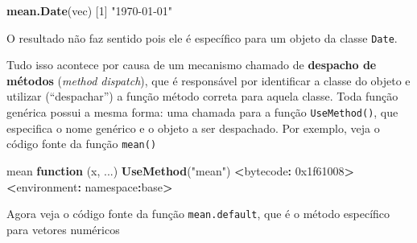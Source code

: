 \documentclass[10pt,a4paper]{book}
\newenvironment{Shaded}{\begin{snugshade}}{\end{snugshade}}
\newcommand{\KeywordTok}[1]{\textcolor[rgb]{0.13,0.29,0.53}{\textbf{#1}}}
\newcommand{\DecValTok}[1]{\textcolor[rgb]{0.00,0.00,0.81}{#1}}
\newcommand{\StringTok}[1]{\textcolor[rgb]{0.31,0.60,0.02}{#1}}
\newcommand{\ControlFlowTok}[1]{\textcolor[rgb]{0.13,0.29,0.53}{\textbf{#1}}}
\newcommand{\OperatorTok}[1]{\textcolor[rgb]{0.81,0.36,0.00}{\textbf{#1}}}
\newcommand{\ErrorTok}[1]{\textcolor[rgb]{0.64,0.00,0.00}{\textbf{#1}}}
\newcommand{\NormalTok}[1]{#1}
\begin{document}
\begin{Shaded}
\begin{Highlighting}[]
\KeywordTok{mean.Date}\NormalTok{(vec)}
\NormalTok{[}\DecValTok{1}\NormalTok{] }\StringTok{"1970-01-01"}
\end{Highlighting}
\end{Shaded}

O resultado não faz sentido pois ele é específico para um objeto da
classe \texttt{Date}.

Tudo isso acontece por causa de um mecanismo chamado de \textbf{despacho
de métodos} (\emph{method dispatch}), que é responsável por identificar
a classe do objeto e utilizar (``despachar'') a função método correta
para aquela classe. Toda função genérica possui a mesma forma: uma
chamada para a função \texttt{UseMethod()}, que especifica o nome
genérico e o objeto a ser despachado. Por exemplo, veja o código fonte
da função \texttt{mean()}

\begin{Shaded}
\begin{Highlighting}[]
\NormalTok{mean}
\ControlFlowTok{function}\NormalTok{ (x, ...) }
\KeywordTok{UseMethod}\NormalTok{(}\StringTok{"mean"}\NormalTok{)}
\OperatorTok{<}\NormalTok{bytecode}\OperatorTok{:}\StringTok{ }\DecValTok{0x1f61008}\OperatorTok{>}
\ErrorTok{<}\NormalTok{environment}\OperatorTok{:}\StringTok{ }\NormalTok{namespace}\OperatorTok{:}\NormalTok{base}\OperatorTok{>}
\end{Highlighting}
\end{Shaded}

Agora veja o código fonte da função \texttt{mean.default}, que é o
método específico para vetores numéricos
\end{document}
